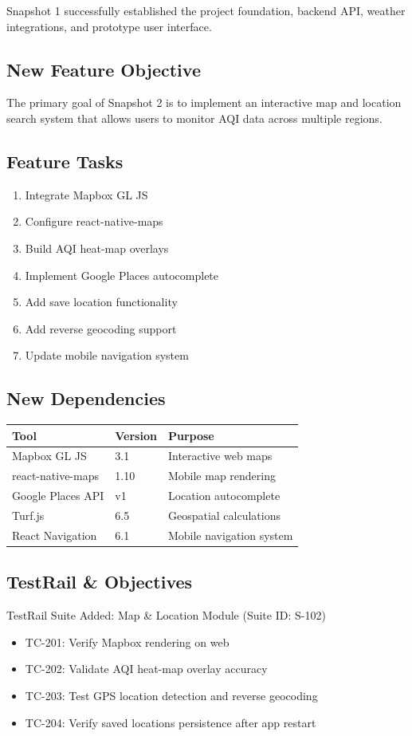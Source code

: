 \documentclass[12pt]{article}
\begin{document}
Snapshot 1 successfully established the project foundation, backend API,
weather integrations, and prototype user interface.

\subsection{New Feature Objective}

The primary goal of Snapshot 2 is to implement an interactive map and
location search system that allows users to monitor AQI data across
multiple regions.

\subsection{Feature Tasks}

\begin{enumerate}
    \item Integrate Mapbox GL JS
    \item Configure react-native-maps
    \item Build AQI heat-map overlays
    \item Implement Google Places autocomplete
    \item Add save location functionality
    \item Add reverse geocoding support
    \item Update mobile navigation system
\end{enumerate}

\subsection{New Dependencies}

\begin{longtable}{|p{5cm}|p{3cm}|p{5cm}|}
\hline
\textbf{Tool} & \textbf{Version} & \textbf{Purpose} \\
\hline
Mapbox GL JS & 3.1 & Interactive web maps \\
\hline
react-native-maps & 1.10 & Mobile map rendering \\
\hline
Google Places API & v1 & Location autocomplete \\
\hline
Turf.js & 6.5 & Geospatial calculations \\
\hline
React Navigation & 6.1 & Mobile navigation system \\
\hline
\end{longtable}


\subsection{TestRail \& Objectives}
TestRail Suite Added: Map \& Location Module (Suite ID: S-102)
\begin{itemize}
    \item TC-201: Verify Mapbox rendering on web
    \item TC-202: Validate AQI heat-map overlay accuracy
    \item TC-203: Test GPS location detection and reverse geocoding
    \item TC-204: Verify saved locations persistence after app restart
\end{itemize}
\end{document}
